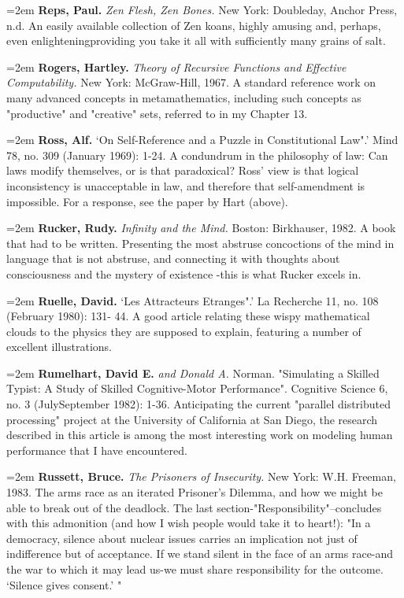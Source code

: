\par\noindent\hangindent=2em {\bf Reps, Paul.} {\it Zen Flesh, Zen Bones.} New York: Doubleday, Anchor Press, n.d. An easily available collection of Zen koans, highly amusing and, perhaps, even enlighteningproviding you take it all with sufficiently many grains of salt.

\par\noindent\hangindent=2em {\bf Rogers, Hartley.} {\it Theory of Recursive Functions and Effective Computability.} New York: McGraw-Hill, 1967. A standard reference work on many advanced concepts in metamathematics, including such concepts as "productive" and "creative" sets, referred to in my Chapter 13.

\par\noindent\hangindent=2em {\bf Ross, Alf.} `On Self-Reference and a Puzzle in Constitutional Law".' Mind 78, no. 309 (January 1969): 1-24. A condundrum in the philosophy of law: Can laws modify themselves, or is that paradoxical? Ross' view is that logical inconsistency is unacceptable in law, and therefore that self-amendment is impossible. For a response, see the paper by Hart (above).

\par\noindent\hangindent=2em {\bf Rucker, Rudy.} {\it Infinity and the Mind.} Boston: Birkhauser, 1982. A book that had to be written. Presenting the most abstruse concoctions of the mind in language that is not abstruse, and connecting it with thoughts about consciousness and the mystery of existence -this is what Rucker excels in.

\par\noindent\hangindent=2em {\bf Ruelle, David.} `Les Attracteurs Etranges".' La Recherche 11, no. 108 (February 1980): 131- 44. A good article relating these wispy mathematical clouds to the physics they are supposed to explain, featuring a number of excellent illustrations.

\par\noindent\hangindent=2em {\bf Rumelhart, David E.} {\it and Donald A.} Norman. "Simulating a Skilled Typist: A Study of Skilled Cognitive-Motor Performance". Cognitive Science 6, no. 3 (JulySeptember 1982): 1-36. Anticipating the current "parallel distributed processing" project at the University of California at San Diego, the research described in this article is among the most interesting work on modeling human performance that I have encountered.

\par\noindent\hangindent=2em {\bf Russett, Bruce.} {\it The Prisoners of Insecurity.} New York: W.H. Freeman, 1983. The arms race as an iterated Prisoner's Dilemma, and how we might be able to break out of the deadlock. The last section-"Responsibility"--concludes with this admonition (and how I wish people would take it to heart!): "In a democracy, silence about nuclear issues carries an implication not just of indifference but of acceptance. If we stand silent in the face of an arms race-and the war to which it may lead us-we must share responsibility for the outcome. `Silence gives consent.' "

